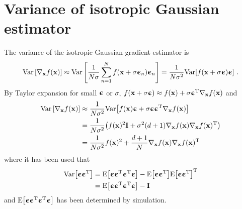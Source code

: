 
\chapter{Variance of isotropic Gaussian estimator}\label{app: Appendix: Variance of isotropic Gaussian estimator}

The variance of the isotropic Gaussian gradient estimator is
\begin{equation}
    \text{Var}\left[\nabla_\x f(\x)\right]
    \approx \text{Var}\left[\frac{1}{N\sigma}\sum_{n=1}^N f(\x+\sigma\epsilonb_n)\epsilonb_n\right]
    = \frac{1}{N\sigma^2}\text{Var}\bra{f(\x+\sigma\epsilonb)\epsilonb} \ . 
\end{equation}
By Taylor expansion for small $\epsilonb$ or $\sigma$, $f(\x+\sigma\epsilonb) \approx f(\x) + \sigma\epsilonb\transpose\nabla_\x f(\x)$ and
\begin{align}
    \text{Var}\left[\nabla_\x f(\x)\right]
    &\approx \frac{1}{N\sigma^2}\text{Var}\bra{f(\x)\epsilonb + \sigma\epsilonb\epsilonb\transpose \nabla_\x f(\x)} \nonumber\\
    &= \frac{1}{N\sigma^2}\pa{f(\x)^2\I + \sigma^2(d+1)\nabla_\x f(\x)\nabla_\x f(\x)^\text{T}}\nonumber\\
    &= \frac{1}{N\sigma^2}f(\x)^2 + \frac{d+1}{N}\nabla_\x f(\x)\nabla_\x f(\x)^\text{T}
\end{align}
where it has been used that 
\begin{align}
    \text{Var}\bra{\epsilonb\epsilonb\transpose}
    &= \text{E}\bra{\epsilonb\epsilonb\transpose\epsilonb\transpose\epsilonb} - \text{E}\bra{\epsilonb\epsilonb\transpose}\text{E}\bra{\epsilonb\epsilonb\transpose}^\text{T}\nonumber\\
    &= \text{E}\bra{\epsilonb\epsilonb\transpose\epsilonb\transpose\epsilonb} - \I
\end{align}
and $\text{E}\bra{\epsilonb\epsilonb\transpose\epsilonb\transpose\epsilonb}$ has been determined by simulation. 

